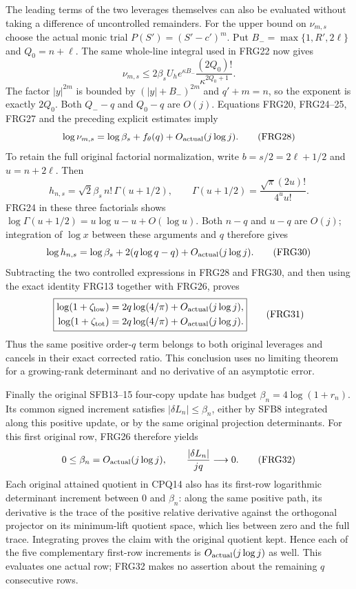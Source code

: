 \documentclass[11pt,a4paper]{article}
\begin{document}
The leading terms of the two leverages themselves can also be
evaluated without taking a difference of uncontrolled remainders.
For the upper bound on $\nu_{m,s}$ choose the actual monic trial
$P(S')=(S'-c')^m$. Put
$B_-=\max\{1,R',2\ell\}$ and $Q_0=n+\ell$. The same whole-line
integral used in FRG22 now gives
\[
\nu_{m,s}\le
2\beta_sU_he^{\kappa B_-}
                  \frac{(2Q_0)!}{\kappa^{2Q_0+1}}.
\tag{FRG27}
\]
The factor $|y|^{2m}$ is bounded by $(|y|+B_-)^{2m}$ and
$q'+m=n$, so the exponent is exactly $2Q_0$.
Both $Q_--q$ and $Q_0-q$ are $O(j)$. Equations FRG20, FRG24--25,
FRG27 and the preceding explicit estimates imply
\[
\log\nu_{m,s}=\log\beta_s+f_\theta(q)+O_{\rm actual}(j\log j).
\tag{FRG28}
\]
To retain the full original factorial normalization, write
$b=s/2=2\ell+1/2$ and $u=n+2\ell$. Then
\[
h_{n,s}=\sqrt2\beta_s\,n!\,\Gamma(u+1/2),\qquad
\Gamma(u+1/2)=\frac{\sqrt\pi(2u)!}{4^u u!}.
\tag{FRG29}
\]
FRG24 in these three factorials shows
$\log\Gamma(u+1/2)=u\log u-u+O(\log u)$.
Both $n-q$ and $u-q$ are $O(j)$; integration of $\log x$ between
these arguments and $q$ therefore gives
\[
\log h_{n,s}=\log\beta_s+2(q\log q-q)+O_{\rm actual}(j\log j).
\tag{FRG30}
\]
Subtracting the two controlled expressions in FRG28 and FRG30, and
then using the exact identity FRG13 together with FRG26, proves
\[
\boxed{\begin{aligned}
\log(1+\zeta_{\rm low})
 &=2q\log(4/\pi)+O_{\rm actual}(j\log j),\\
\log(1+\zeta_{\rm tot})
 &=2q\log(4/\pi)+O_{\rm actual}(j\log j).
\end{aligned}}\tag{FRG31}
\]
Thus the same positive order-$q$ term belongs to both original
leverages and cancels in their exact corrected ratio. This conclusion
uses no limiting theorem for a growing-rank determinant and no derivative
of an asymptotic error.

Finally the original SFB13--15 four-copy update has budget
$\beta_n=4\log(1+r_n)$. Its common signed increment satisfies
$|\delta L_n|\le\beta_n$, either by SFB8 integrated along this
positive update, or by the same original projection determinants.
For this first original row, FRG26 therefore yields
\[
0\le\beta_n=O_{\rm actual}(j\log j),\qquad
\frac{|\delta L_n|}{j q}\longrightarrow0.
\tag{FRG32}
\]
Each original attained quotient in CPQ14 also has its first-row
logarithmic determinant increment between $0$ and $\beta_n$:
along the same positive path, its derivative is the trace of the
positive relative derivative against the orthogonal projector on its
minimum-lift quotient space, which lies between zero and the full
trace. Integrating proves the claim with the original quotient kept.
Hence each of the five complementary first-row increments is
$O_{\rm actual}(j\log j)$ as well. This evaluates one actual row;
FRG32 makes no assertion about the remaining $q$ consecutive rows.
\end{document}
